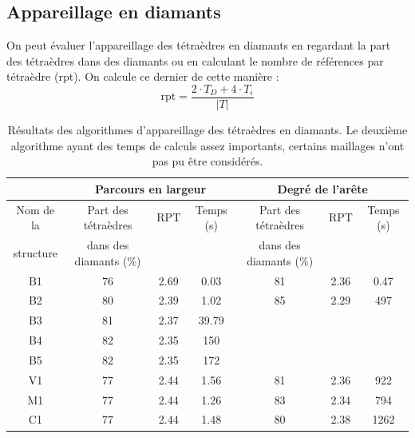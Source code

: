 \subsection{Appareillage en diamants}
\noindent
On peut évaluer l'appareillage des tétraèdres en diamants en regardant la part des tétraèdres dans des diamants ou en calculant le nombre de références par tétraèdre (rpt). On calcule ce dernier de cette manière :\\
\begin{equation}
\text{rpt} = \frac{2\cdot T_D+4\cdot T_i}{|T|}
\end{equation}
\begin{table}[H]
\centering
\footnotesize
\begin{tabular}{|c | c | c | c| c | c | c |}
\hline
& \multicolumn{3}{|c|}{Parcours en largeur}& \multicolumn{3}{|c|}{Degré de l'arête}\\
\hline
Nom de la & Part des tétraèdres & RPT & Temps (s) & Part des tétraèdres & RPT & Temps (s)\\
structure&dans des diamants (\%)&&&dans des diamants (\%)&&\\
\hline
B1 & 76 & 2.69 & 0.03 & 81 & 2.36 & 0.47 \\
B2 &  80 & 2.39 & 1.02 & 85 & 2.29 & 497 \\
B3 & 81& 2.37 & 39.79 &  &  &\\
B4 & 82& 2.35 & 150 &  &  &\\
B5 & 82 & 2.35 & 172 &  &  &\\
V1 & 77& 2.44 & 1.56 & 81& 2.36 & 922\\
M1 & 77& 2.44 & 1.26 & 83 & 2.34 & 794\\
C1 & 77& 2.44 & 1.48 & 80 & 2.38 & 1262\\
\hline  
\end{tabular}
\caption{Résultats des algorithmes d'appareillage des tétraèdres en diamants. Le deuxième algorithme ayant des temps de calculs assez importants, certains maillages n'ont pas pu être considérés.}
\label{tab:results_performances}
\end{table}

